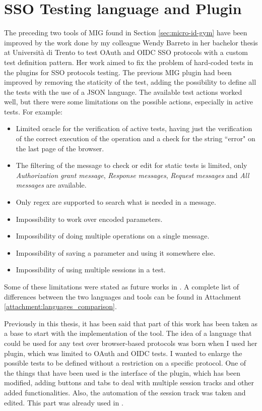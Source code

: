 \section{SSO Testing language and Plugin}
The preceding two tools of MIG found in Section \ref{sec:micro-id-gym} have been improved by the work done by my colleague Wendy Barreto \cite{wendy_barreto} in her bachelor thesis at Università di Trento to test \gls{OAuth} and \gls{OIDC} SSO protocols with a custom test definition pattern. Her work aimed to fix the problem of hard-coded tests in the plugins for SSO protocols testing. The previous MIG plugin had been improved by removing the staticity of the test, adding the possibility to define all the tests with the use of a JSON language.
The available test actions worked well, but there were some limitations on the possible actions, especially in active tests. For example:
\begin{itemize}
    \item Limited oracle for the verification of active tests, having just the verification of the correct execution of the operation and a check for the string ``error" on the last page of the browser.
    \item The filtering of the message to check or edit for static tests is limited, only \textit{Authorization grant message}, \textit{Response messages}, \textit{Request messages} and \textit{All messages} are available.
    \item Only regex are supported to search what is needed in a message.
    \item Impossibility to work over encoded parameters.
    \item Impossibility of doing multiple operations on a single message.
    \item Impossibility of saving a parameter and using it somewhere else.
    \item Impossibility of using multiple sessions in a test.
\end{itemize}
Some of these limitations were stated as future works in \cite{wendy_barreto}. A complete list of differences between the two languages and tools can be found in Attachment \ref{attachment:languages_comparison}.

Previously in this thesis, it has been said that part of this work has been taken as a base to start with the implementation of the tool. The idea of a language that could be used for any test over browser-based protocols was born when I used her plugin, which was limited to \gls{OAuth} and \gls{OIDC} tests. I wanted to enlarge the possible tests to be defined without a restriction on a specific protocol. 
One of the things that have been used is the interface of the plugin, which has been modified, adding buttons and tabs to deal with multiple \gls{session track}s and other added functionalities. Also, the automation of the \gls{session track} was taken and edited. This part was already used in \cite{claudio_grisenti,stefano_facchini}.




